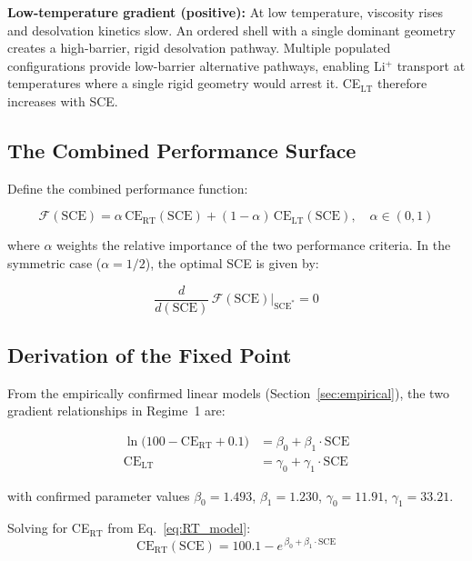 \documentclass[11pt]{article}
\theoremstyle{plain}
\theoremstyle{definition}
\theoremstyle{remark}
\begin{document}
\medskip\noindent\textbf{Low-temperature gradient (positive):}
At low temperature, viscosity rises and desolvation kinetics slow.  An ordered
shell with a single dominant geometry creates a high-barrier, rigid desolvation
pathway.  Multiple populated configurations provide low-barrier alternative
pathways, enabling Li$^+$ transport at temperatures where a single rigid geometry
would arrest it.  CE$_{\mathrm{LT}}$ therefore increases with SCE.

\subsection{The Combined Performance Surface}

Define the combined performance function:

\begin{equation}
  \mathcal{F}(\mathrm{SCE}) = \alpha\,\mathrm{CE}_{\mathrm{RT}}(\mathrm{SCE})
  + (1-\alpha)\,\mathrm{CE}_{\mathrm{LT}}(\mathrm{SCE}), \quad \alpha \in (0,1)
  \label{eq:combined}
\end{equation}

\noindent where $\alpha$ weights the relative importance of the two performance
criteria.  In the symmetric case ($\alpha = 1/2$), the optimal SCE is given by:

\begin{equation}
  \frac{d}{d(\mathrm{SCE})}\,\mathcal{F}(\mathrm{SCE})\Big|_{\mathrm{SCE}^{*}} = 0
  \label{eq:FOC}
\end{equation}

\subsection{Derivation of the Fixed Point}

From the empirically confirmed linear models (Section~\ref{sec:empirical}),
the two gradient relationships in Regime~1 are:

\begin{align}
  \ln\!\bigl(100 - \mathrm{CE}_{\mathrm{RT}} + 0.1\bigr)
    &= \beta_0 + \beta_1 \cdot \mathrm{SCE}
  \label{eq:RT_model}\\[4pt]
  \mathrm{CE}_{\mathrm{LT}}
    &= \gamma_0 + \gamma_1 \cdot \mathrm{SCE}
  \label{eq:LT_model}
\end{align}

\noindent with confirmed parameter values
$\beta_0 = 1.493$, $\beta_1 = 1.230$, $\gamma_0 = 11.91$, $\gamma_1 = 33.21$.

Solving for CE$_{\mathrm{RT}}$ from Eq.~\eqref{eq:RT_model}:
\begin{equation}
  \mathrm{CE}_{\mathrm{RT}}(\mathrm{SCE})
  = 100.1 - e^{\,\beta_0 + \beta_1 \cdot \mathrm{SCE}}
  \label{eq:CE_RT_explicit}
\end{equation}
\end{document}
